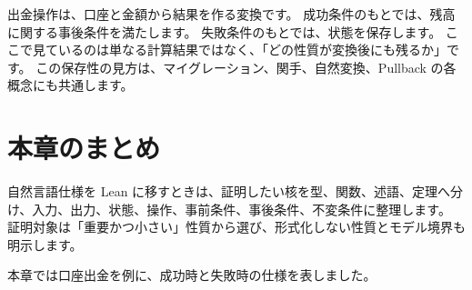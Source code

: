 出金操作は、口座と金額から結果を作る変換です。
成功条件のもとでは、残高に関する事後条件を満たします。
失敗条件のもとでは、状態を保存します。
ここで見ているのは単なる計算結果ではなく、「どの性質が変換後にも残るか」です。
この保存性の見方は、マイグレーション、関手、自然変換、Pullback の各概念にも共通します。

\section{本章のまとめ}

自然言語仕様を Lean に移すときは、証明したい核を型、関数、述語、定理へ分け、入力、出力、状態、操作、事前条件、事後条件、不変条件に整理します。
証明対象は「重要かつ小さい」性質から選び、形式化しない性質とモデル境界も明示します。

本章では口座出金を例に、成功時と失敗時の仕様を表しました。
